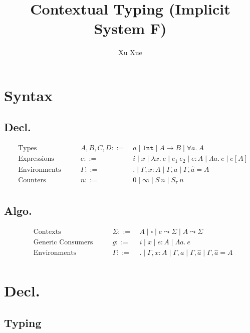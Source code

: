 \documentclass{article}
\title{Contextual Typing (Implicit System F)}
\author{Xu Xue}
\begin{document}
\maketitle

\section{Syntax}

\subsection{Decl.}

\begin{align*}
&\text{Types} \quad\quad &A, B, C, D ::=&~ a \mid \mathtt{Int} \mid A \rightarrow B \mid \forall a.~A\\
&\text{Expressions} \quad \quad &e::=&~ i \mid x \mid \lambda x . ~e \mid e_1~e_2 \mid e : A \mid \Lambda a.~e \mid e[A]\\
&\text{Environments} \quad\quad &\Gamma::=&~ . \mid \Gamma, x : A \mid \Gamma, a \mid \Gamma, \hat{a} = A\\
&\text{Counters} \quad\quad &n ::=&~ 0 \mid \infty \mid S~n \mid S_{\tau}~n\\
\end{align*}

\subsection{Algo.}

\begin{align*}
    &\text{Contexts} \quad\quad &\Sigma ::=&~ A \mid \square \mid \boxed{e} \leadsto \Sigma \mid \boxed{A} \leadsto \Sigma\\
    &\text{Generic Consumers} \quad \quad &g::=&~ i \mid x \mid e : A \mid \Lambda a.~e\\
    &\text{Environments} \quad\quad &\Gamma ::=&~ . \mid \Gamma, x : A \mid \Gamma, a \mid \Gamma, \hat{a} \mid \Gamma, \hat{a}= A\\
\end{align*}


\section{Decl.}

\subsection{Typing}
\end{document}
